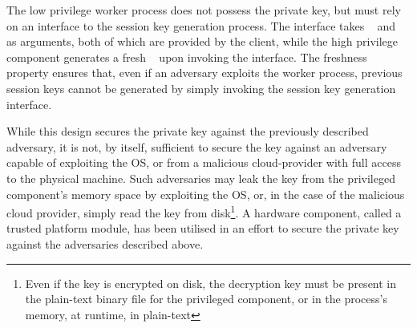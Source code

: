 \documentclass[../main.tex]{subfiles}
\begin{document}
The low privilege worker process does not possess the private
key, but must rely on an interface to the session key generation
process. The interface takes \crandom~ and \premaster~ as arguments,
both of which are provided by the client, while the high privilege
component generates a fresh \srandom~ upon invoking the interface. The
freshness property ensures that, even if an adversary exploits the
worker process, previous session keys cannot be generated by simply
invoking the session key generation interface.

While this design secures the private key against the previously
described adversary, it is not, by itself, sufficient to secure the
key against an adversary capable of exploiting the OS, or from a
malicious cloud-provider with full access to the physical
machine. Such adversaries may leak the key from the privileged
component's memory space by exploiting the OS, or, in the case of the
malicious cloud provider, simply read the key from disk\footnote{Even
  if the key is encrypted on disk, the decryption key must be present
  in the plain-text binary file for the privileged component, or in the
  process's memory, at runtime, in plain-text}.  A hardware component,
called a trusted platform module, has been utilised in an effort to
secure the private key against the adversaries described above.
\end{document}
